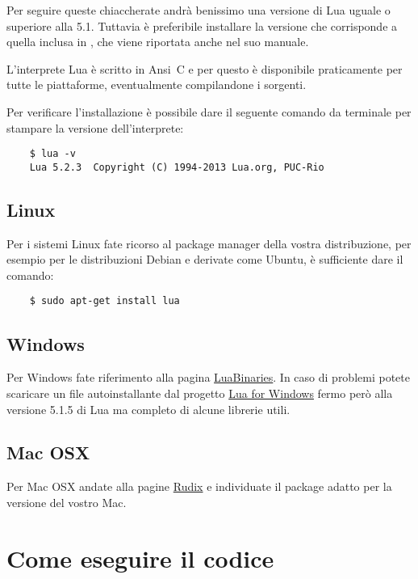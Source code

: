 Per seguire queste chiaccherate andrà benissimo una versione di Lua uguale o
superiore alla 5.1. Tuttavia è preferibile installare la versione che
corrisponde a quella inclusa in \LuaTeX{}, che viene riportata anche nel suo
manuale.

L'interprete Lua è scritto in Ansi~C e per questo è disponibile praticamente
per tutte le piattaforme, eventualmente compilandone i sorgenti.

Per verificare l'installazione è possibile dare il seguente comando da
terminale per stampare la versione dell'interprete:
\begin{Verbatim}
    $ lua -v
    Lua 5.2.3  Copyright (C) 1994-2013 Lua.org, PUC-Rio
\end{Verbatim}



\subsection{Linux}

Per i sistemi Linux fate ricorso al package manager della vostra distribuzione,
per esempio per le distribuzioni Debian e derivate come Ubuntu, è sufficiente
dare il comando:
\begin{Verbatim}
    $ sudo apt-get install lua
\end{Verbatim}



\subsection{Windows}

Per Windows fate riferimento alla pagina
\href{http://luabinaries.sourceforge.net/index.html}{LuaBinaries}. In caso di
problemi potete scaricare un file autoinstallante dal progetto
\href{https://github.com/rjpcomputing/luaforwindows}{Lua for Windows} fermo
però alla versione 5.1.5 di Lua ma completo di alcune librerie utili.



\subsection{Mac OSX}

Per Mac OSX andate alla pagine \href{http://rudix.org/packages/lua.html}{Rudix}
e individuate il package adatto per la versione del vostro Mac.



\section{Come eseguire il codice}

